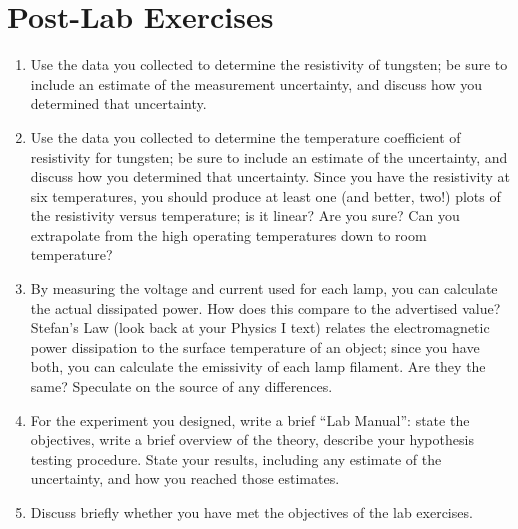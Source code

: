 \documentclass[12pt]{article}
\begin{document}
\section*{Post-Lab Exercises}

\begin{enumerate}
\item Use the data you collected to determine the resistivity of
  tungsten; be sure to include an estimate of the measurement
  uncertainty, and discuss how you determined that uncertainty.
\item Use the data you collected to determine the temperature
  coefficient of resistivity for tungsten; be sure to include an
  estimate of the uncertainty, and discuss how you determined that
  uncertainty.  Since you have the resistivity at six temperatures,
  you should produce at least one (and better, two!) plots of the
  resistivity versus temperature; is it linear?  Are you sure?  Can
  you extrapolate from the high operating temperatures down to room
  temperature? 
\item By measuring the voltage and current used for each lamp, you can
  calculate the actual dissipated power.  How does this compare to the
  advertised value?  Stefan's Law (look back at your Physics I text)
  relates the electromagnetic power dissipation to the surface
  temperature of an object; since you have both, you can calculate the
  emissivity of each lamp filament.  Are they the same?  Speculate on
  the source of any differences.
\item For the experiment you designed, write a brief ``Lab Manual'':
  state the objectives, write a brief overview of the theory, describe
  your hypothesis testing procedure.  State your results, including
  any estimate of the uncertainty, and how you reached those
  estimates.  
\item Discuss briefly whether you have met the objectives of the lab
  exercises. 
\end{enumerate}
\end{document}

